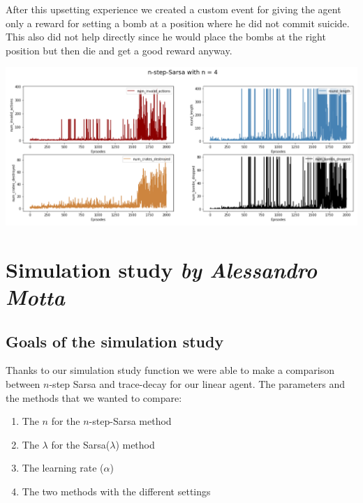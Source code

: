 After this upsetting experience we created a custom event for giving the agent only a reward for setting a bomb at a position where he did not commit suicide. This also did not help directly since he would place the bombs at the right position but then die and get a good reward anyway.
\begin{center}
\includegraphics[scale=0.22]{graphics/plot06.png}
\end{center}

\section[Simulation study]{Simulation study \hfill \small \normalfont\textit{by Alessandro Motta}}

\subsection{Goals of the simulation study}
Thanks to our simulation study function we were able to make a comparison between $n$-step Sarsa and trace-decay for our linear agent. The parameters and the methods that we wanted to compare:
\begin{enumerate}
\item The $n$ for the $n$-step-Sarsa method
\item The $\lambda$ for the Sarsa($\lambda$) method
\item The learning rate ($\alpha$) 
\item The two methods with the different settings
\end{enumerate}

